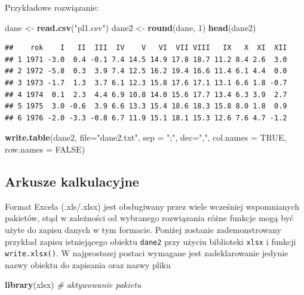 \documentclass[]{book}
\newenvironment{Shaded}{\begin{snugshade}}{\end{snugshade}}
\newcommand{\KeywordTok}[1]{\textcolor[rgb]{0.13,0.29,0.53}{\textbf{#1}}}
\newcommand{\DataTypeTok}[1]{\textcolor[rgb]{0.13,0.29,0.53}{#1}}
\newcommand{\DecValTok}[1]{\textcolor[rgb]{0.00,0.00,0.81}{#1}}
\newcommand{\StringTok}[1]{\textcolor[rgb]{0.31,0.60,0.02}{#1}}
\newcommand{\CommentTok}[1]{\textcolor[rgb]{0.56,0.35,0.01}{\textit{#1}}}
\newcommand{\OtherTok}[1]{\textcolor[rgb]{0.56,0.35,0.01}{#1}}
\newcommand{\NormalTok}[1]{#1}
\theoremstyle{definition}
\theoremstyle{definition}
\theoremstyle{definition}
\theoremstyle{remark}
\begin{document}
Przykładowe rozwiązanie:

\begin{Shaded}
\begin{Highlighting}[]
\NormalTok{dane <-}\StringTok{ }\KeywordTok{read.csv}\NormalTok{(}\StringTok{"pl1.csv"}\NormalTok{)}
\NormalTok{dane2 <-}\StringTok{ }\KeywordTok{round}\NormalTok{(dane, }\DecValTok{1}\NormalTok{)}
\KeywordTok{head}\NormalTok{(dane2)}
\end{Highlighting}
\end{Shaded}

\begin{verbatim}
##    rok    I   II  III  IV    V   VI  VII VIII   IX   X  XI  XII
## 1 1971 -3.0  0.4 -0.1 7.4 14.5 14.9 17.8 18.7 11.2 8.4 2.6  3.0
## 2 1972 -5.8  0.3  3.9 7.4 12.5 16.2 19.4 16.6 11.4 6.1 4.4  0.0
## 3 1973 -1.7  1.3  3.7 6.1 12.3 15.8 17.6 17.1 13.1 6.6 1.8 -0.7
## 4 1974  0.1  2.3  4.4 6.9 10.8 14.0 15.6 17.7 13.4 6.3 3.9  2.7
## 5 1975  3.0 -0.6  3.9 6.6 13.3 15.4 18.6 18.3 15.8 8.0 1.8  0.9
## 6 1976 -2.0 -3.3 -0.8 6.7 11.9 15.1 18.1 15.3 12.6 7.6 4.7 -1.2
\end{verbatim}

\begin{Shaded}
\begin{Highlighting}[]
\KeywordTok{write.table}\NormalTok{(dane2, }\DataTypeTok{file=}\StringTok{"dane2.txt"}\NormalTok{, }\DataTypeTok{sep =} \StringTok{";"}\NormalTok{, }\DataTypeTok{dec=}\StringTok{","}\NormalTok{, }\DataTypeTok{col.names =} \OtherTok{TRUE}\NormalTok{, }\DataTypeTok{row.names =} \OtherTok{FALSE}\NormalTok{)}
\end{Highlighting}
\end{Shaded}

\subsection{Arkusze kalkulacyjne}\label{arkusze}

Format Excela (.xls/.xlsx) jest obsługiwany przez wiele wcześniej
wspomnianych pakietów, stąd w zależności od wybranego rozwiązania różne
funkcje mogą być użyte do zapisu danych w tym formacie. Poniżej zostanie
zademonstrowany przykład zapisu istniejącego obiektu \texttt{dane2} przy
użyciu biblioteki \texttt{xlsx} i funkcji \texttt{write.xlsx()}. W
najprostszej postaci wymagane jest zadeklarowanie jedynie nazwy obiektu
do zapisania oraz nazwy pliku

\begin{Shaded}
\begin{Highlighting}[]
\KeywordTok{library}\NormalTok{(xlsx) }\CommentTok{# aktywowanie pakietu}
\end{Highlighting}
\end{Shaded}
\end{document}
